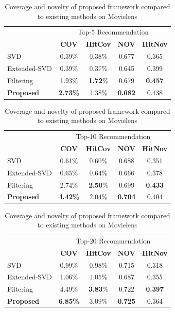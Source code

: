 \documentclass[a4paper,12pt]{report}
\begin{document}
\begin{table}[!htp]
    \centering
    \caption{Coverage and novelty of proposed framework compared to existing methods on Movielens}
    \begin{tabular}{|l ||c c| c c |}
    \hline
        & \multicolumn{4}{c|}{Top-5 Recommendation} \\
    \cline{2-5}
        &  \textbf{COV} & \textbf{HitCov} & \textbf{NOV} & \textbf{HitNov} \\
    \hline
     SVD               &  0.39\%  & 0.38\% & 0.677 & 0.365 \\
     Extended-SVD      &  0.39\%  & 0.37\% & 0.645  & 0.399  \\ 
     Filtering         &  1.93\%  & \textbf{1.72}\% & 0.679 & \textbf{0.457}   \\
     \textbf{Proposed} &  \textbf{2.73\%} & 1.38\% & \textbf{0.682} & 0.438  \\
     \hline
    \end{tabular}
    \bigskip
    
    \begin{tabular}{|l ||c c| c c |}
    \hline
        & \multicolumn{4}{c|}{Top-10 Recommendation} \\
    \cline{2-5}
        &  \textbf{COV} & \textbf{HitCov} & \textbf{NOV} & \textbf{HitNov} \\
    \hline
     SVD               &  0.61\%  & 0.60\% & 0.688 & 0.351 \\
     Extended-SVD      &  0.65\%  & 0.64\% & 0.666 & 0.378 \\ 
     Filtering         &  2.74\%  & \textbf{2.50}\% & 0.699 & \textbf{0.433}  \\
     \textbf{Proposed} &  \textbf{4.42\%} & 2.04\% & \textbf{0.704} & 0.404  \\
     \hline
    \end{tabular}
    \bigskip
    
    \begin{tabular}{|l ||c c| c c |}
    \hline
        & \multicolumn{4}{c|}{Top-20 Recommendation} \\
    \cline{2-5}
        &  \textbf{COV} & \textbf{HitCov} & \textbf{NOV} & \textbf{HitNov} \\
    \hline
     SVD               &  0.99\%  & 0.98\% & 0.715 & 0.318 \\
     Extended-SVD      &  1.06\%  & 1.05\% & 0.687 & 0.355 \\ 
     Filtering         &  4.49\%  & \textbf{3.83}\% & 0.722 & \textbf{0.397}  \\
     \textbf{Proposed} &  \textbf{6.85\%} & 3.09\% & \textbf{0.725} & 0.364 \\
     \hline
    \end{tabular}
    \label{tab:ML_cov&nov}
\end{table}
\end{document}

